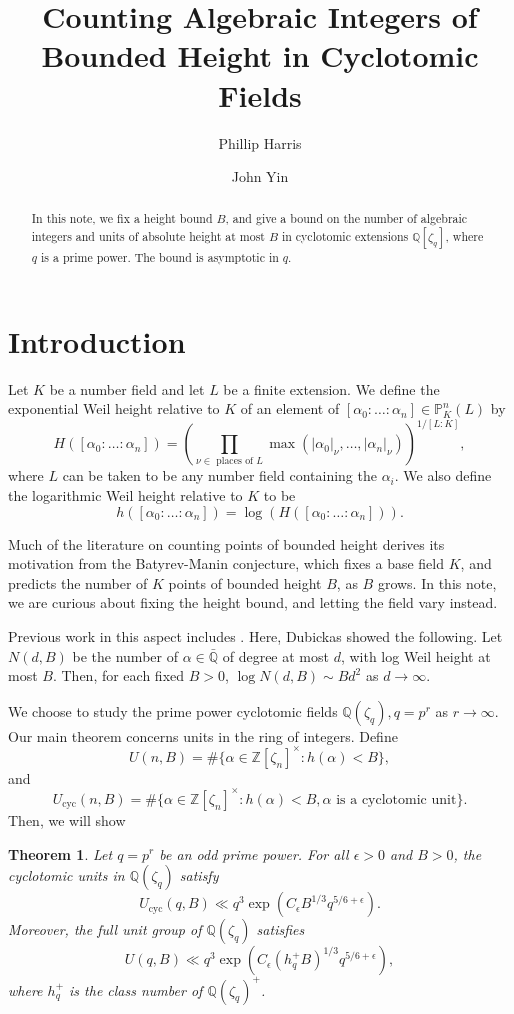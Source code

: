 \documentclass{article}
\title{Counting Algebraic Integers of Bounded Height in Cyclotomic Fields}
\author[1]{Phillip Harris}
\affil[1]{University of Bonn}
\author[2]{John Yin}
\affil[2]{The Ohio State University}
\newtheorem{thm}{Theorem}
\newcommand{\bQ}{\mathbb{Q}}
\DeclareMathOperator{\cyc}{cyc}
\def\bbQ{ {\mathbb Q}}
\def\bbZ{ {\mathbb Z}}
\def\bbP{ {\mathbb P}}
\begin{document}
\maketitle

\begin{abstract}
   In this note, we fix a height bound $B$, and give a bound on the number of algebraic integers and units of absolute height at most $B$ in cyclotomic extensions $\bbQ[\zeta_q]$, where $q$ is a prime power. The bound is asymptotic in $q$.
\end{abstract}

\section{Introduction}


Let $K$ be a number field and let $L$ be a finite extension. We define the exponential Weil height relative to $K$ of an element of $[\alpha_0: \dots :\alpha_n] \in \bbP^n_K(L)$ by $$H([\alpha_0:\dots:\alpha_n]) = \left(\prod_{\nu \in \text{ places of }L} \max(|\alpha_0|_{\nu}, \dots, |\alpha_n|_{\nu})\right)^{1/[L:K]},$$ where $L$ can be taken to be any number field containing the $\alpha_i$. We also define the logarithmic Weil height relative to $K$ to be 
\[
h([\alpha_0:\dots:\alpha_n]) =
    \log(H([\alpha_0:\dots:\alpha_n])).
\]

Much of the literature on counting points of bounded height derives its motivation from the Batyrev-Manin conjecture, which fixes a base field $K$, and predicts the number of $K$ points of bounded height $B$, as $B$ grows. In this note, we are curious about fixing the height bound, and letting the field vary instead.

Previous work in this aspect includes \cite{DUBICKAS_2018}. Here, Dubickas showed the following. Let $N(d, B)$ be the number of $\alpha \in \bar \bbQ$ of degree at most $d$, with log Weil height at most $B$. Then, for each fixed $B > 0$, $\log N(d, B) \sim B d^2$ as $d \to \infty$. 

We choose to study the prime power cyclotomic fields $\bQ(
\zeta_q), q = p^r$ as $r \to \infty$. Our main theorem concerns units in the ring of integers. Define
\[
U(n,B) = \# \{\alpha \in \bbZ[\zeta_n]^{\times}: h(\alpha) < B\},
\]
and
\[
U_{\cyc}(n,B) = \# \{\alpha \in \bbZ[\zeta_n]^{\times}: h(\alpha) < B, \alpha \text{ is a cyclotomic unit}\}.
\]
Then, we will show
\begin{thm} \label{thm:main}
    Let $q=p^r$ be an odd prime power. For all $\epsilon > 0$ and $B>0$, the cyclotomic units in $\bQ(\zeta_q)$ satisfy
    \[
    U_{\cyc}(q,B) \ll q^3 \exp \left( C_\epsilon B^{1/3} q^{5/6+\epsilon} \right).
    \]
    Moreover, the full unit group of $\bQ(\zeta_q)$ satisfies
    \[
    U(q,B) \ll q^3 \exp \left( C_\epsilon (h_q^+ B)^{1/3} q^{5/6+\epsilon} \right),
    \]
    where $h_q^+$ is the class number of $\bQ(\zeta_q)^+$.
\end{thm}
\end{document}

